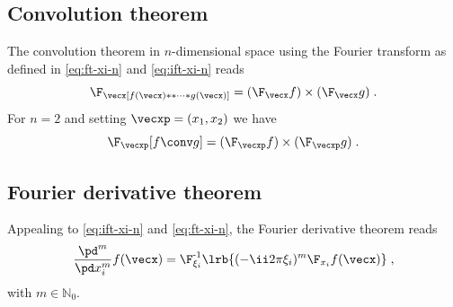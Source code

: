 \documentclass[
twoside,
openright,
titlepage,
numbers=noenddot,
headinclude,
fleqn,
a4paper,
footinclude=true,
cleardoublepage=empty,
abstractoff,
BCOR=5mm,
paper=a4,
fontsize=11pt,
british,ngerman,american,
]{scrreprt}
\begin{document}
\subsection{Convolution theorem}
\label{sec:convolution-xi}

The convolution theorem in $n$-dimensional space using the Fourier
transform as defined in \cref{eq:ft-xi-n} and \cref{eq:ift-xi-n} reads
\begin{equation}
  \label{eq:convolution-theorem-xi-n}
  \F_\vecx[f(\vecx)\ast\ast\dots\ast g(\vecx)] = 
  (\F_\vecx f) \times (\F_\vecx g) \;.
\end{equation}
For $n=2$ and setting $\vecxp=(x_1,x_2)$ we have
\begin{equation}
  \label{eq:convolution-theorem-xi}
    \F_{\vecxp}[f \conv g] = (\F_{\vecxp} f) \times (\F_{\vecxp} g) \;.
\end{equation}


\subsection{Fourier derivative theorem}
\label{sec:fourier-derivative-xi-n}

Appealing to \cref{eq:ift-xi-n} and \cref{eq:ft-xi-n}, the Fourier
derivative theorem reads
\begin{equation}
  \label{eq:fdt-xi-n}
  \frac{\pd^m}{\pd x_i^m} f(\vecx) = \F^{\operatorname{-1}}_{\xi_i}
  \lrb{ (-\ii2\pi \xi_i)^m \F_{x_i} f(\vecx) } \;,
\end{equation}
with $m\in\mathbb{N}_0$.
\end{document}
